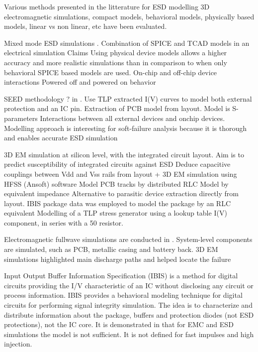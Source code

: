Various methods presented in the litterature for ESD modelling
3D electromagnetic simulations, compact models, behavioral models, physically based models, linear vs non linear, etc have been evaluated.

Mixed mode ESD simulations \cite{mixedModeESDSims}.
Combination of SPICE and TCAD models in an electrical simulation
Claims Using physical device models allows a higher accuracy and more realistic simulations than in comparison to when only behavioral SPICE based models are used.
On-chip and off-chip device interactions
Powered off and powered on behavior

SEED methodology ? in \cite{usb2ESDProtection}.
Use TLP extracted I(V) curves to model both external protection and an IC pin.
Extraction of PCB model from layout.
Model is S-parameters
Interactions between all external devices and onchip devices.
Modelling approach is interesting for soft-failure analysis because it is thorough and enables accurate ESD simulation

3D EM simulation \cite{LacrampeTransientImmunity} at silicon level, with the integrated circuit layout.
Aim is to predict susceptibility of integrated circuits against ESD
Deduce capacitive couplings between Vdd and Vss rails from layout + 3D EM simulation using HFSS (Ansoft) software
Model PCB tracks by distributed RLC
Model by equivalent impedance
Alternative to parasitic device extraction directly from layout.
IBIS package data was employed to model the package by an RLC equivalent
Modelling of a TLP stress generator using a lookup table I(V) component, in series with a 50\textOmega{} resistor.

Electromagnetic fullwave simulations are conducted in \cite{softFailMobile}.
System-level components are simulated, such as PCB, metallic casing and battery back.
3D EM simulations highlighted main discharge paths and helped locate the failure

Input Output Buffer Information Specification (IBIS) \cite{ibis-spec} is a method for digital circuits providing the I/V characteristic of an IC without disclosing any circuit or process information.
IBIS provides a behavioral modeling technique for digital circuits for performing signal integrity simulation.
The idea is to characterize and distribute information about the package, buffers and protection diodes (not ESD protections), not the IC core.
It is demonstrated in \cite{ibisImprovementFabrice} that for EMC and ESD simulations the model is not sufficient.
It is not defined for fast impulses and high injection.
